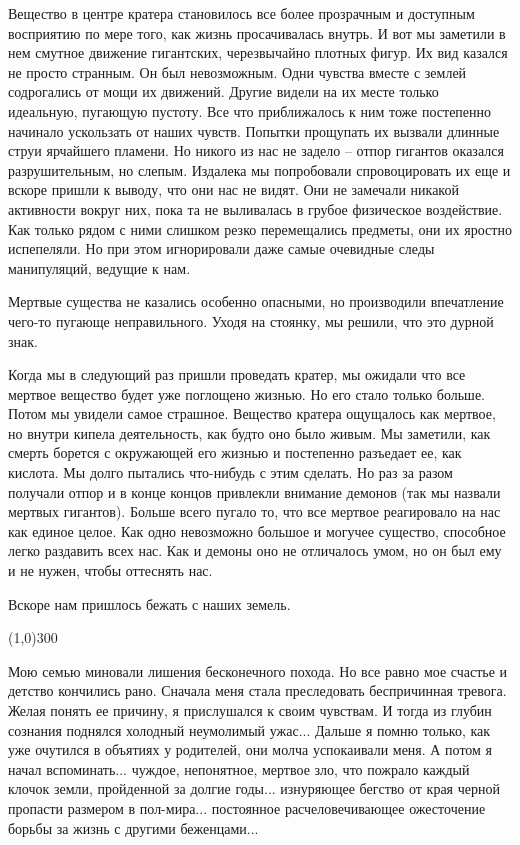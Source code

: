 \documentclass[12pt,a4paper]{article}
\newcommand{\sep}{
	\begin{center}
		\line(1,0){300}
	\end{center}
}
\begin{document}
Вещество в центре кратера становилось все более прозрачным и доступным восприятию по мере того, как жизнь просачивалась внутрь. И вот мы заметили в нем смутное движение гигантских, черезвычайно плотных фигур. Их вид казался не просто странным. Он был невозможным. Одни чувства вместе с землей содрогались от мощи их движений. Другие видели на их месте только идеальную, пугающую пустоту. Все что приближалось к ним тоже постепенно начинало ускользать от наших чувств. Попытки прощупать их вызвали длинные струи ярчайшего пламени. Но никого из нас не задело -- отпор гигантов оказался разрушительным, но слепым. Издалека мы попробовали спровоцировать их еще и вскоре пришли к выводу, что они нас не видят. Они не замечали никакой активности вокруг них, пока та не выливалась в грубое физическое воздействие. Как только рядом с ними слишком резко перемещались предметы, они их яростно испепеляли. Но при этом игнорировали даже самые очевидные следы манипуляций, ведущие к нам.

Мертвые существа не казались особенно опасными, но производили впечатление чего-то пугающе неправильного. Уходя на стоянку, мы решили, что это дурной знак.

Когда мы в следующий раз пришли проведать кратер, мы ожидали что все мертвое вещество будет уже поглощено жизнью. Но его стало только больше. Потом мы увидели самое страшное. Вещество кратера ощущалось как мертвое, но внутри кипела деятельность, как будто оно было живым. Мы заметили, как смерть борется с окружающей его жизнью и постепенно разъедает ее, как кислота. Мы долго пытались что-нибудь с этим сделать. Но раз за разом получали отпор и в конце концов привлекли внимание демонов (так мы назвали мертвых гигантов). Больше всего пугало то, что все мертвое реагировало на нас как единое целое. Как одно невозможно большое и могучее существо, способное легко раздавить всех нас. Как и демоны оно не отличалось умом, но он был ему и не нужен, чтобы оттеснять нас.

Вскоре нам пришлось бежать с наших земель.

\sep

Мою семью миновали лишения бесконечного похода. Но все равно мое счастье и детство кончились рано. Сначала меня стала преследовать беспричинная тревога. Желая понять ее причину, я прислушался к своим чувствам. И тогда из глубин сознания поднялся холодный неумолимый ужас... Дальше я помню только, как уже очутился в объятиях у родителей, они молча успокаивали меня. А потом я начал вспоминать... чуждое, непонятное, мертвое зло, что пожрало каждый клочок земли, пройденной за долгие годы... изнуряющее бегство от края черной пропасти размером в пол-мира... постоянное расчеловечивающее ожесточение борьбы за жизнь с другими беженцами...
\end{document}
